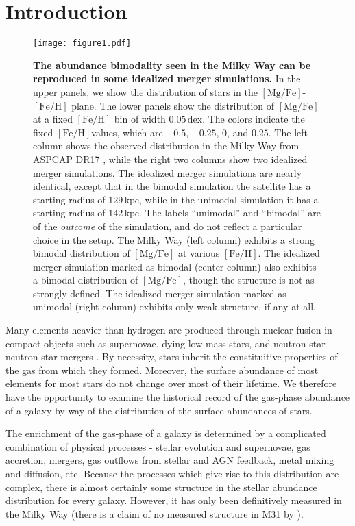 \documentclass[linenumbers, twocolumn]{aastex631}
\newcommand{\kpc}{\ensuremath{\textrm{kpc}}}
\newcommand{\FeH}{\ensuremath{[\textrm{Fe}/\textrm{H}]}}
\newcommand{\MgFe}{\ensuremath{[\textrm{Mg}/\textrm{Fe}]}}
\newcommand{\dex}{\ensuremath{\textrm{dex}}}
\begin{document}
\section{Introduction} \label{sec:intro}
\begin{figure*}
  \centering
  \texttt{[image: figure1.pdf]}
  \caption{\textbf{The abundance bimodality seen in the Milky Way can be reproduced in some idealized merger simulations.} In the upper panels, we show the distribution of stars in the \MgFe{}-\FeH{} plane. The lower panels show the distribution of \MgFe{} at a fixed \FeH{} bin of width $0.05\,\dex$. The colors indicate the fixed \FeH values, which are $-0.5$, $-0.25$, $0$, and $0.25$. The left column shows the observed distribution in the Milky Way from ASPCAP DR17 \citep[][J.A.~Holtzman et al., in preparation]{2016AJ....151..144G}, while the right two columns show two idealized merger simulations. The idealized merger simulations are nearly identical, except that in the bimodal simulation the satellite has a starting radius of $129\,\kpc$, while in the unimodal simulation it has a starting radius of $142\,\kpc$. The labels ``unimodal'' and ``bimodal'' are of the \textit{outcome} of the simulation, and do not reflect a particular choice in the setup. The Milky Way (left column) exhibits a strong bimodal distribution of \MgFe{} at various \FeH{}. The idealized merger simulation marked as bimodal (center column) also exhibits a bimodal distribution of \MgFe{}, though the structure is not as strongly defined. The idealized merger simulation marked as unimodal (right column) exhibits only weak structure, if any at all.}
  \label{fig:fig1}
\end{figure*}

Many elements heavier than hydrogen are produced through nuclear fusion in compact objects such as supernovae, dying low mass stars, and neutron star-neutron star mergers \citep[e.g.][]{2023A&ARv..31....1A}. By necessity, stars inherit the constituitive properties of the gas from which they formed. Moreover, the surface abundance of most elements for most stars do not change over most of their lifetime. We therefore have the opportunity to examine the historical record of the gas-phase abundance of a galaxy by way of the distribution of the surface abundances of stars.

The enrichment of the gas-phase of a galaxy is determined by a complicated combination of physical processes - stellar evolution and supernovae, gas accretion, mergers, gas outflows from stellar and AGN feedback, metal mixing and diffusion, etc. Because the processes which give rise to this distribution are complex, there is almost certainly some structure in the stellar abundance distribution for every galaxy. However, it has only been definitively measured in the Milky Way (there is a claim of no measured structure in M31 by \citet{2024IAUS..377..115N}).
\end{document}
